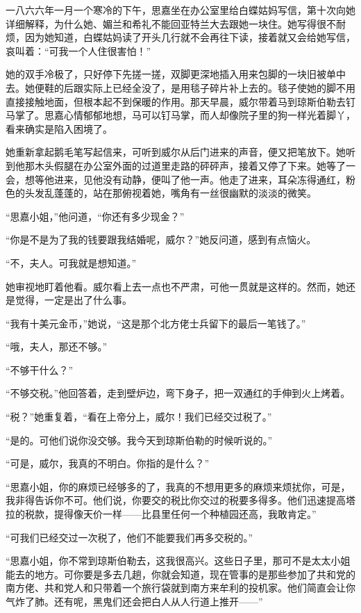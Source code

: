 \par 一八六六年一月一个寒冷的下午，思嘉坐在办公室里给白蝶姑妈写信，第十次向她详细解释，为什么她、媚兰和希礼不能回亚特兰大去跟她一块住。她写得很不耐烦，因为她知道，白蝶姑妈读了开头几行就不会再往下读，接着就又会给她写信，哀叫着：“可我一个人住很害怕！”
\par 她的双手冷极了，只好停下先搓一搓，双脚更深地插入用来包脚的一块旧被单中去。她便鞋的后跟实际上已经全没了，是用毯子碎片补上去的。毯子使她的脚不用直接接触地面，但根本起不到保暖的作用。那天早晨，威尔带着马到琼斯伯勒去钉马掌了。思嘉心情郁郁地想，马可以钉马掌，而人却像院子里的狗一样光着脚丫，看来确实是陷入困境了。
\par 她重新拿起鹅毛笔写起信来，可听到威尔从后门进来的声音，便又把笔放下。她听到他那木头假腿在办公室外面的过道里走路的砰砰声，接着又停了下来。她等了一会，想等他进来，见他没有动静，便叫了他一声。他走了进来，耳朵冻得通红，粉色的头发乱蓬蓬的，站在那俯视着她，嘴角有一丝很幽默的淡淡的微笑。
\par “思嘉小姐，”他问道，“你还有多少现金？”
\par “你是不是为了我的钱要跟我结婚呢，威尔？”她反问道，感到有点恼火。
\par “不，夫人。可我就是想知道。”
\par 她审视地盯着他看。威尔看上去一点也不严肃，可他一贯就是这样的。然而，她还是觉得，一定是出了什么事。
\par “我有十美元金币，”她说，“这是那个北方佬士兵留下的最后一笔钱了。”
\par “哦，夫人，那还不够。”
\par “不够干什么？”
\par “不够交税。”他回答着，走到壁炉边，弯下身子，把一双通红的手伸到火上烤着。
\par “税？”她重复着，“看在上帝分上，威尔！我们已经交过税了。”
\par “是的。可他们说你没交够。我今天到琼斯伯勒的时候听说的。”
\par “可是，威尔，我真的不明白。你指的是什么？”
\par “思嘉小姐，你的麻烦已经够多的了，我真的不想用更多的麻烦来烦扰你，可是，我非得告诉你不可。他们说，你要交的税比你交过的税要多得多。他们迅速提高塔拉的税款，提得像天价一样——比县里任何一个种植园还高，我敢肯定。”
\par “可我们已经交过一次税了，他们不能要我们再多交税的。”
\par “思嘉小姐，你不常到琼斯伯勒去，这我很高兴。这些日子里，那可不是太太小姐能去的地方。可你要是多去几趟，你就会知道，现在管事的是那些参加了共和党的南方佬、共和党人和只带着一个旅行袋就到南方来牟利的投机家。他们简直会让你气炸了肺。还有呢，黑鬼们还会把白人从人行道上推开——”
